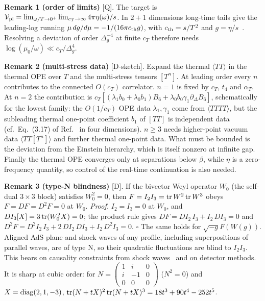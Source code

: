 \textbf{Remark 1 (order of limits)} [Q]. The target is $\mathcal V_{\rm pl}=\lim_{\omega/T\to0^+}\lim_{c_T\to\infty}4\pi\eta(\omega)/s$.
In $2+1$ dimensions long-time tails give the leading-log running $\mu\,dg/d\mu=-1/(16\pi c_{\rm th}g)$, with $c_{\rm th}=s/T^2$ and
$g=\eta/s$~\cite{Kovtun:2012rj}. Resolving a deviation of order $\Delta_g^{-4}$ at finite $c_T$ therefore needs
$\log(\mu_0/\omega)\ll c_T/\Delta_g^4$.

\textbf{Remark 2 (multi-stress data)} [D-sketch]. Expand the thermal $\langle TT\rangle$ in the thermal OPE over $T$ and the
multi-stress tensors $[T^n]$. At leading order every $n$ contributes to the connected $O(c_T)$ correlator. $n=1$ is fixed by
$c_T$, $t_4$ and $\alpha_T$. At $n=2$ the contribution is $c_T[(\lambda_1b_0+\lambda_0b_1)B_6+\lambda_0b_0\gamma_1\partial_\Delta B_6]$,
schematically for the lowest family: the $O(1/c_T)$ OPE data $\lambda_1,\gamma_1$ come from $\langle TTTT\rangle$, but the
subleading thermal one-point coefficient $b_1$ of $[TT]$ is independent data (cf.\ Eq.~(3.17) of Ref.~\cite{Karlsson:2022osn}
in four dimensions). $n\ge3$ needs higher-point vacuum data $\langle TT[T^n]\rangle$ and further thermal one-point data. What
must be bounded is the deviation from the Einstein hierarchy, which is itself nonzero at infinite gap. Finally the thermal OPE
converges only at separations below $\beta$, while $\eta$ is a zero-frequency quantity, so control of the real-time continuation
is also needed.

\textbf{Remark 3 (type-N blindness)} [D]. If the bivector Weyl operator $W_0$ (the self-dual $3\times3$ block) satisfies
$W_0^2=0$, then $F=I_2I_3={\rm tr}\,W^2\,{\rm tr}\,W^3$ obeys $F=DF=D^2F=0$ at $W_0$. \emph{Proof.} $I_2=I_3=0$ at $W_0$, and
$DI_3[X]=3\,{\rm tr}(W_0^2X)=0$; the product rule gives $DF=DI_2\,I_3+I_2\,DI_3=0$ and
$D^2F=D^2I_2\,I_3+2\,DI_2\,DI_3+I_2\,D^2I_3=0$. $\square$ The same holds for $\sqrt{-g}F(W(g))$. Aligned AdS plane and shock waves
of any profile, including superpositions of parallel waves, are of type N, so their quadratic fluctuations are blind to $I_2I_3$.
This bears on causality constraints from shock waves~\cite{Belin:2019mnx} and on detector methods. It is sharp at cubic order:
for $N=\begin{pmatrix}1&i&0\\i&-1&0\\0&0&0\end{pmatrix}$ ($N^2=0$) and $X={\rm diag}(2,1,-3)$,
${\rm tr}(N+tX)^2\,{\rm tr}(N+tX)^3=18t^3+90t^4-252t^5$.

